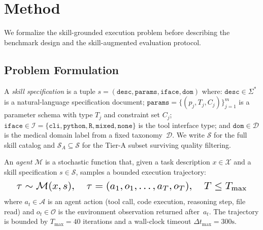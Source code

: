 
\section{Method}
\label{sec:method}

We formalize the skill-grounded execution problem before describing the benchmark design and the skill-augmented evaluation protocol.


\subsection{Problem Formulation}
\label{subsec:problem}

\begin{definition}
\label{def:skill}
A \emph{skill specification} is a tuple $s = (\texttt{desc}, \texttt{params}, \texttt{iface}, \texttt{dom})$ where:
$\texttt{desc} \in \Sigma^*$ is a natural-language specification document;
$\texttt{params} = \{(p_j, T_j, C_j)\}_{j=1}^{m}$ is a parameter schema with type $T_j$ and constraint set $C_j$;
$\texttt{iface} \in \mathcal{I} = \{\texttt{cli}, \texttt{python}, \texttt{R}, \texttt{mixed}, \texttt{none}\}$ is the tool interface type;
and $\texttt{dom} \in \mathcal{D}$ is the medical domain label from a fixed taxonomy~$\mathcal{D}$.
We write $\mathcal{S}$ for the full skill catalog and $\mathcal{S}_A \subseteq \mathcal{S}$ for the Tier-A subset surviving quality filtering.
\end{definition}

\begin{definition}
\label{def:agent}
An \emph{agent} $\mathcal{M}$ is a stochastic function that, given a task description $x \in \mathcal{X}$ and a skill specification $s \in \mathcal{S}$, samples a bounded execution trajectory:
\begin{equation}
    \resizebox{0.94\columnwidth}{!}{$\displaystyle
        \tau \sim \mathcal{M}(x, s), \quad
        \tau = (a_1, o_1, \ldots, a_T, o_T), \quad
        T \leq T_{\max}
    $}
    \label{eq:trajectory}
\end{equation}
where $a_t \in \mathcal{A}$ is an agent action (tool call, code execution, reasoning step, file read) and $o_t \in \mathcal{O}$ is the environment observation returned after~$a_t$. The trajectory is bounded by $T_{\max} = 40$ iterations and a wall-clock timeout $\Delta t_{\max} = 300\text{s}$.
\end{definition}

